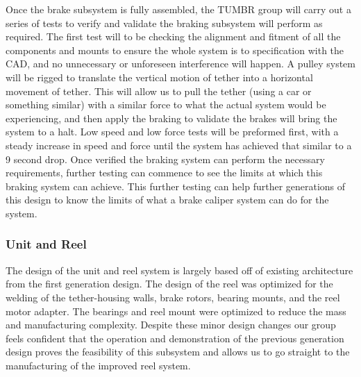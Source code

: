 Once the brake subsystem is fully assembled, the TUMBR group will carry out a series of tests to verify and validate the braking subsystem will perform as required. The first test will to be checking the alignment and fitment of all the components and mounts to ensure the whole system is to specification with the CAD, and no unnecessary or unforeseen interference will happen. A pulley system will be rigged to translate the vertical motion of tether into a horizontal movement of tether. This will allow us to pull the tether (using a car or something similar) with a similar force to what the actual system would be experiencing, and then apply the braking to validate the brakes will bring the system to a halt. Low speed and low force tests will be preformed first, with a steady increase in speed and force until the system has achieved that similar to a 9 second drop. Once verified the braking system can perform the necessary requirements, further testing can commence to see the limits at which this braking system can achieve. This further testing can help further generations of this design to know the limits of what a brake caliper system can do for the system. 


\subsubsection{Unit and Reel}

\indent\indent The design of the unit and reel system is largely based off of existing architecture from the first generation design. The design of the reel was optimized for the welding of the tether-housing walls, brake rotors, bearing mounts, and the reel motor adapter. The bearings and reel mount were optimized to reduce the mass and manufacturing complexity.
Despite these minor design changes our group feels confident that the operation and demonstration of the previous generation design proves the feasibility of this subsystem and allows us to go straight to the manufacturing of the improved reel system. 

